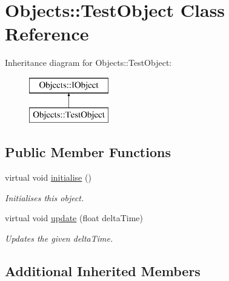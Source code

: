 \hypertarget{class_objects_1_1_test_object}{\section{Objects\-:\-:Test\-Object Class Reference}
\label{class_objects_1_1_test_object}
}
Inheritance diagram for Objects\-:\-:Test\-Object\-:\begin{figure}[H]
\begin{center}
\leavevmode
\includegraphics[height=2.000000cm]{class_objects_1_1_test_object}
\end{center}
\end{figure}
\subsection*{Public Member Functions}
\begin{DoxyCompactItemize}
\item 
\hypertarget{class_objects_1_1_test_object_aaca6ace404d3d0c889284bb189370007}{virtual void \hyperlink{class_objects_1_1_test_object_aaca6ace404d3d0c889284bb189370007}{initialise} ()}\label{class_objects_1_1_test_object_aaca6ace404d3d0c889284bb189370007}

\begin{DoxyCompactList}\small\item\em Initialises this object. \end{DoxyCompactList}\item 
virtual void \hyperlink{class_objects_1_1_test_object_a5df5df31f7f1233cd991d200ecac7205}{update} (float delta\-Time)
\begin{DoxyCompactList}\small\item\em Updates the given delta\-Time. \end{DoxyCompactList}\end{DoxyCompactItemize}
\subsection*{Additional Inherited Members}



